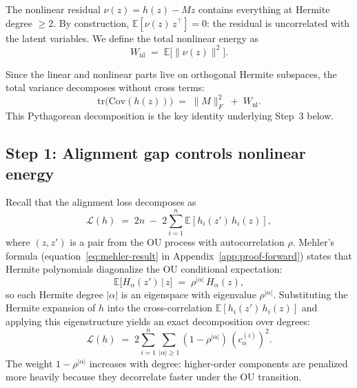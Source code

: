 The nonlinear residual $\nu(z) = h(z) - Mz$ contains everything at Hermite degree $\geq 2$.
By construction, $\mathbb{E}[\nu(z)\, z^\top] = 0$: the residual is uncorrelated with the latent variables.
We define the total nonlinear energy as
\begin{equation}
    W_{\mathrm{nl}} \;=\; \mathbb{E}\bigl[\|\nu(z)\|^2\bigr].
\end{equation}

Since the linear and nonlinear parts live on orthogonal Hermite subspaces, the total variance decomposes without cross terms:
\begin{equation}\label{eq:parseval-split}
    \mathrm{tr}\bigl(\mathrm{Cov}(h(z))\bigr)
    \;=\; \|M\|_F^2 \;+\; W_{\mathrm{nl}}.
\end{equation}
This Pythagorean decomposition is the key identity underlying Step~3 below.



\subsection{Step 1: Alignment gap controls nonlinear energy}

Recall that the alignment loss decomposes as
\begin{equation}
    \mathcal{L}(h) \;=\; 2n \;-\; 2\sum_{i=1}^n
    \mathbb{E}\!\left[h_i(z')\, h_i(z)\right],
\end{equation}
where $(z, z')$ is a pair from the OU process with autocorrelation $\rho$.
Mehler's formula (equation~\eqref{eq:mehler-result} in Appendix~\ref{app:proof-forward}) states that Hermite polynomials
diagonalize the OU conditional expectation:
\begin{equation}
    \mathbb{E}\bigl[H_\alpha(z')\,\big|\,z\bigr]
    \;=\; \rho^{|\alpha|}\, H_\alpha(z),
\end{equation}
so each Hermite degree $|\alpha|$ is an eigenspace with eigenvalue
$\rho^{|\alpha|}$. Substituting the Hermite expansion of $h$ into the
cross-correlation $\mathbb{E}[h_i(z')\,h_i(z)]$ and applying this
eigenstructure yields an exact decomposition over degrees:
\begin{equation}\label{eq:loss-hermite}
    \mathcal{L}(h) \;=\; 2\sum_{i=1}^n \sum_{|\alpha| \geq 1}
    (1 - \rho^{|\alpha|})\,(c_\alpha^{(i)})^2.
\end{equation}
The weight $1 - \rho^{|\alpha|}$ increases with degree: higher-order
components are penalized more heavily because they decorrelate faster
under the OU transition.


